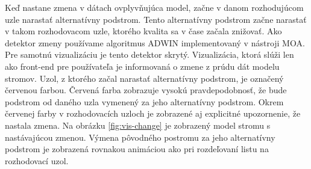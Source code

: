 \label{fig:vis-hb-color}
\par
Keď nastane zmena v dátach ovplyvňujúca model, začne v danom rozhodujúcom uzle narastať alternatívny podstrom. Tento alternatívny podstrom začne narastať v takom rozhodovacom uzle, ktorého kvalita sa v čase začala znižovať. Ako detektor zmeny používame algoritmus ADWIN implementovaný v nástroji MOA. Pre samotnú vizualizáciu je tento detektor skrytý. Vizualizácia, ktorá slúži len ako front-end pre používateľa je informovaná o zmene z prúdu dát modelu stromov. Uzol, z ktorého začal narastať alternatívny podstrom, je označený červenou farbou. Červená farba zobrazuje vysokú pravdepodobnosť, že bude podstrom od daného uzla vymenený za jeho alternatívny podstrom. Okrem červenej farby v rozhodovacích uzloch je zobrazené aj explicitné upozornenie, že nastala zmena. Na obrázku \ref{fig:vis-change} je zobrazený model stromu s nastávajúcou zmenou. Výmena pôvodného postromu za jeho alternatívny podstrom je zobrazená rovnakou animáciou ako pri rozdeľovaní listu na rozhodovací uzol.
\label{fig:vis-change}

